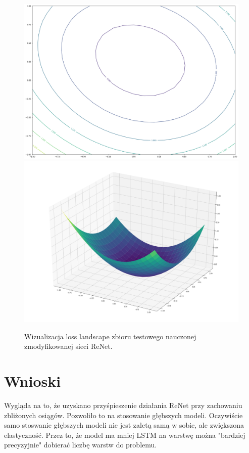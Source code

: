 \documentclass[oneside, mag]{mgr}
\begin{document}
\begin{figure}
\centering
	\includegraphics[width=1.0\textwidth]{img/loss_modif_ReNet.png}
	\includegraphics[width=1.0\textwidth]{img/loss_3d_modif_ReNet.png}
	\caption{Wizualizacja loss landscape zbioru testowego nauczonej zmodyfikowanej sieci ReNet.}
	\label{fig:loss_ReNet}
\end{figure}


\chapter{Wnioski}

Wygląda na to, że uzyskano przyśpieszenie działania ReNet przy zachowaniu zbliżonych osiągów. Pozwoliło to na stosowanie głębszych modeli. Oczywiście samo stoswanie głębszych modeli nie jest zaletą samą w sobie, ale zwiększona elastyczność. Przez to, że model ma mniej LSTM na warstwę można "bardziej precyzyjnie" dobierać liczbę warstw do problemu. 
\end{document}
